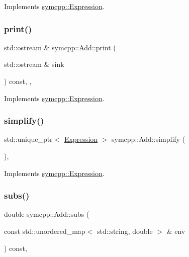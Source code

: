 Implements \mbox{\hyperlink{classsymcpp_1_1Expression_a181c162d5740faac392ffdca26bfca0c}{symcpp\+::\+Expression}}.

\mbox{\label{classsymcpp_1_1Add_a4e73df4d72972d00ab139c5db4a93a0b}} 
\subsubsection{\texorpdfstring{print()}{print()}}
{\footnotesize\ttfamily std\+::ostream \& symcpp\+::\+Add\+::print (\begin{DoxyParamCaption}\item[{std\+::ostream \&}]{sink }\end{DoxyParamCaption}) const\hspace{0.3cm}{\ttfamily [override]}, {\ttfamily [private]}, {\ttfamily [virtual]}}



Implements \mbox{\hyperlink{classsymcpp_1_1Expression_af37e13032a40f2da4d2866eaa8658049}{symcpp\+::\+Expression}}.

\mbox{\label{classsymcpp_1_1Add_a5a68fdd76c2206399dd5a78c4b317505}} 
\subsubsection{\texorpdfstring{simplify()}{simplify()}}
{\footnotesize\ttfamily std\+::unique\+\_\+ptr$<$ \mbox{\hyperlink{classsymcpp_1_1Expression}{Expression}} $>$ symcpp\+::\+Add\+::simplify (\begin{DoxyParamCaption}{ }\end{DoxyParamCaption})\hspace{0.3cm}{\ttfamily [override]}, {\ttfamily [virtual]}}



Implements \mbox{\hyperlink{classsymcpp_1_1Expression_ab1fa6e55eea0682250d013f28db26cd2}{symcpp\+::\+Expression}}.

\mbox{\label{classsymcpp_1_1Add_a79d0aa670728ba4a257e777ed4ac1ec0}} 
\subsubsection{\texorpdfstring{subs()}{subs()}}
{\footnotesize\ttfamily double symcpp\+::\+Add\+::subs (\begin{DoxyParamCaption}\item[{const std\+::unordered\+\_\+map$<$ std\+::string, double $>$ \&}]{env }\end{DoxyParamCaption}) const\hspace{0.3cm}{\ttfamily [override]}, {\ttfamily [virtual]}}




